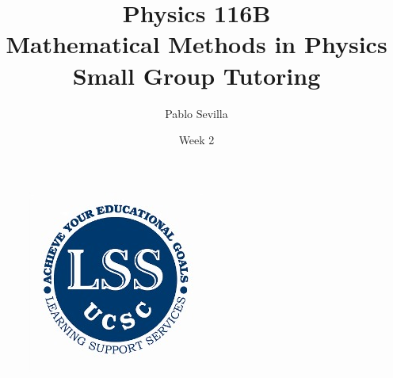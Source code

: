 \documentclass{article}
\title{Physics 116B \\ Mathematical Methods in Physics\\ Small Group Tutoring}
\author{Pablo Sevilla}
\date{Week 2}
\begin{document}
\maketitle

\begin{figure}[h]
\centering
\includegraphics[scale=0.3]{lss}
\end{figure}
\end{document}
